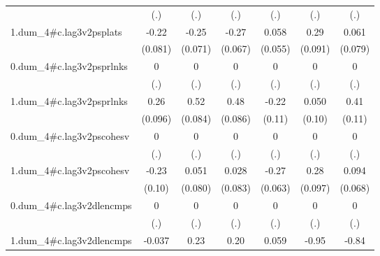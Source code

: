 \begin{table}[htbp]
\begin{tabular}{l*{6}{c}}
            &         (.)         &         (.)         &         (.)         &         (.)         &         (.)         &         (.)         \\
[1em]
1.dum\_4#c.lag3v2psplats&       -0.22\sym{**} &       -0.25\sym{***}&       -0.27\sym{***}&       0.058         &        0.29\sym{**} &       0.061         \\
            &     (0.081)         &     (0.071)         &     (0.067)         &     (0.055)         &     (0.091)         &     (0.079)         \\
[1em]
0.dum\_4#c.lag3v2psprlnks&           0         &           0         &           0         &           0         &           0         &           0         \\
            &         (.)         &         (.)         &         (.)         &         (.)         &         (.)         &         (.)         \\
[1em]
1.dum\_4#c.lag3v2psprlnks&        0.26\sym{**} &        0.52\sym{***}&        0.48\sym{***}&       -0.22\sym{*}  &       0.050         &        0.41\sym{***}\\
            &     (0.096)         &     (0.084)         &     (0.086)         &      (0.11)         &      (0.10)         &      (0.11)         \\
[1em]
0.dum\_4#c.lag3v2pscohesv&           0         &           0         &           0         &           0         &           0         &           0         \\
            &         (.)         &         (.)         &         (.)         &         (.)         &         (.)         &         (.)         \\
[1em]
1.dum\_4#c.lag3v2pscohesv&       -0.23\sym{*}  &       0.051         &       0.028         &       -0.27\sym{***}&        0.28\sym{**} &       0.094         \\
            &      (0.10)         &     (0.080)         &     (0.083)         &     (0.063)         &     (0.097)         &     (0.068)         \\
[1em]
0.dum\_4#c.lag3v2dlencmps&           0         &           0         &           0         &           0         &           0         &           0         \\
            &         (.)         &         (.)         &         (.)         &         (.)         &         (.)         &         (.)         \\
[1em]
1.dum\_4#c.lag3v2dlencmps&      -0.037         &        0.23\sym{***}&        0.20\sym{**} &       0.059         &       -0.95\sym{***}&       -0.84\sym{***}\\

\end{tabular}
\end{table}

